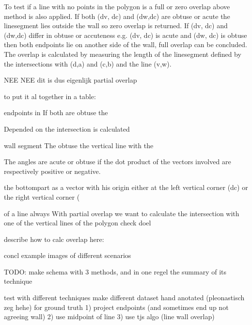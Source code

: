 \documentclass[10pt]{article}
\begin{document}
	To test if a line with no points in the polygon is a full or zero overlap above method is also applied.
	If both (dv, dc) and (dw,dc) are obtuse or acute the linesegment lies outside the wall so zero overlap is returned.
	If (dv, dc) and (dw,dc) differ in obtuse or accuteness e.g. (dv, dc) is acute and (dw, dc) is obtuse then 
	both endpoints lie on another side of the wall, full overlap can be concluded.
	The overlap is calculated by measuring the length of the linesegment defined by the intersections with (d,a) and (c,b) and the line (v,w).
	
	NEE NEE dit is dus eigenlijk partial overlap

	to put it al together in a table:



	endpoints in  
	If both are obtuse the 

	Depended on the intersection is calculated 

	wall segment
	The obtuse 
	the vertical line with the 
	
	The angles are acute or obtuse if the dot product of the vectors involved are
	respectively positive or negative.
	
	the bottompart as a vector with his origin either at the left vertical corner (dc) or the right vertical corner (
	


	 of a line always 
	With partial overlap we want to calculate the intersection with one of the vertical lines of the polygon
	check
	doel


	describe how to calc overlap here:

	concl
	example images of different scenarios


	TODO:
	make schema with 3 methods, and in one regel the summary of its technique
	
	test with different techniques
	make different dataset
	hand anotated (pleonastisch zeg hehe) for ground truth
	1) project endpoints (and sometimes end up not agreeing wall)
	2) use midpoint of line
	3) use tjs algo (line wall overlap)
\end{document}
